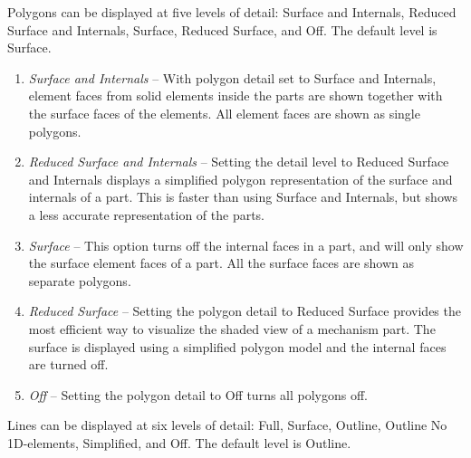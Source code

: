 
Polygons can be displayed at five levels of detail:
Surface and Internals, Reduced Surface and Internals,
Surface, Reduced Surface, and Off. The default level is Surface.

\begin{enumerate}
\item{\sl Surface and Internals} --
  With polygon detail set to Surface and Internals,
  element faces from solid elements inside the parts are shown
  together with the surface faces of the elements.
  All element faces are shown as single polygons.
\item{\sl Reduced Surface and Internals} --
  Setting the detail level to Reduced Surface and Internals displays
  a simplified polygon representation of the surface and internals of a part.
  This is faster than using Surface and Internals,
  but shows a less accurate representation of the parts.
\item{\sl Surface} --
  This option turns off the internal faces in a part,
  and will only show the surface element faces of a part.
  All the surface faces are shown as separate polygons.
\item{\sl Reduced Surface} --
  Setting the polygon detail to Reduced Surface provides the most efficient way
  to visualize the shaded view of a mechanism part.
  The surface is displayed using a simplified polygon model
  and the internal faces are turned off.
\item{\sl Off} --
  Setting the polygon detail to Off turns all polygons off.
\end{enumerate}

Lines can be displayed at six levels of detail: Full, Surface, Outline, Outline
No 1D-elements, Simplified, and Off. The default level is Outline.

